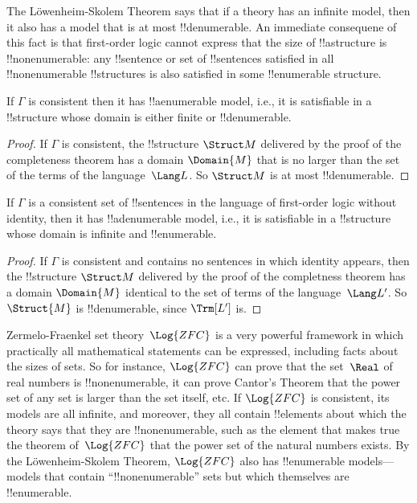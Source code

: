 \documentclass[../../../include/open-logic-section]{subfiles}
\begin{document}

The L\"owenheim-Skolem Theorem says that if a theory has an infinite
model, then it also has a model that is at most !!{denumerable}. An
immediate consequene of this fact is that first-order logic cannot
express that the size of !!a{structure} is !!{nonenumerable}: any
!!{sentence} or set of !!{sentence}s satisfied in all
!!{nonenumerable} !!{structure}s is also satisfied in some
!!{enumerable} structure.

\begin{thm} 
 If $\Gamma$ is consistent then it has
!!a{enumerable} model, i.e., it is satisfiable in a !!{structure}
whose domain is either finite or !!{denumerable}.
\end{thm}

\begin{proof}
If $\Gamma$ is consistent, the !!{structure} $\Struct M$ delivered by
the proof of the completeness theorem has a domain $\Domain{M}$ that
is no larger than the set of the terms of the language~$\Lang L$. So
$\Struct M$ is at most !!{denumerable}.
\end{proof}

\begin{thm}
 If $\Gamma$ is a consistent set of !!{sentence}s
in the language of first-order logic without identity, then it has
!!a{denumerable} model, i.e., it is satisfiable in a !!{structure}
whose domain is infinite and !!{enumerable}.
\end{thm}

\begin{proof}
If $\Gamma$ is consistent and contains no sentences in which identity
appears, then the !!{structure} $\Struct M$ delivered by the proof of
the completness theorem has a domain $\Domain{M}$ identical to the set
of terms of the language~$\Lang L'$. So $\Struct{M}$ is
!!{denumerable}, since $\Trm[L']$ is.
\end{proof}

\begin{ex}
Zermelo-Fraenkel set theory~$\Log{ZFC}$ is a very powerful framework
in which practically all mathematical statements can be expressed,
including facts about the sizes of sets. So for instance, $\Log{ZFC}$
can prove that the set~$\Real$ of real numbers is !!{nonenumerable},
it can prove Cantor's Theorem that the power set of any set is larger
than the set itself, etc.  If $\Log{ZFC}$ is consistent, its models
are all infinite, and moreover, they all contain !!{element}s about
which the theory says that they are !!{nonenumerable}, such as the
element that makes true the theorem of~$\Log{ZFC}$ that the power set
of the natural numbers exists. By the L\"owenheim-Skolem Theorem,
$\Log{ZFC}$ also has !!{enumerable} models---models that contain
``!!{nonenumerable}'' sets but which themselves are !!{enumerable}.
\end{ex}
\end{document}
